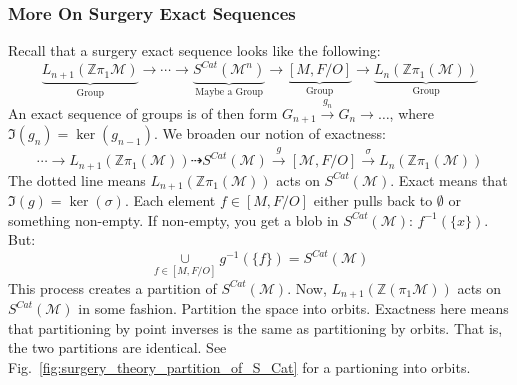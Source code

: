 \documentclass{article}
\theoremstyle{mystyle}
\begin{document}
\subsubsection{More On Surgery Exact Sequences}
Recall that a surgery exact sequence looks like the following:
\begin{equation*}
    \underset{\textrm{Group}}{\underbrace{L_{n+1}(\mathbb{Z}\pi_{1}\mathcal{M})}} \rightarrow \cdots \rightarrow \underset{\textrm{Maybe a Group}}{\underbrace{S^{Cat}(\mathcal{M}^{n})}} \rightarrow \underset{\textrm{Group}}{\underbrace{[M,F/O]}} \rightarrow \underset{\textrm{Group}}{\underbrace{L_{n}(\mathbb{Z}\pi_{1}(\mathcal{M}))}} 
\end{equation*}
An exact sequence of groups is of then form $G_{n+1}\overset{g_{n}}{\rightarrow} G_{n}\rightarrow \hdots$, where $\Im(g_n) = \ker(g_{n-1})$. We broaden our notion of exactness:
\begin{equation*}
    \cdots \rightarrow L_{n+1}(\mathbb{Z}\pi_{1}(\mathcal{M})) \dashrightarrow S^{Cat}(\mathcal{M}) \overset{g}{\rightarrow} [\mathcal{M},F/O] \overset{\sigma}{\rightarrow} L_{n}(\mathbb{Z}\pi_{1}(\mathcal{M}))
\end{equation*}
The dotted line means $L_{n+1}(\mathbb{Z}\pi_{1}(\mathcal{M}))$ acts on $S^{Cat}(\mathcal{M})$. Exact means that $\Im(g) = \ker(\sigma)$. Each element $f\in [M,F/O]$ either pulls back to $\emptyset$ or something non-empty. If non-empty, you get a blob in $S^{Cat}(\mathcal{M})$: $f^{-1}(\{x\})$. But:
\begin{equation*}
    \underset{f\in [M,F/O]}{\cup}g^{-1}(\{f\}) = S^{Cat}(\mathcal{M})
\end{equation*}
This process creates a partition of $S^{Cat}(\mathcal{M})$. Now, $L_{n+1}(\mathbb{Z}(\pi_{1}\mathcal{M}))$ acts on $S^{Cat}(\mathcal{M})$ in some fashion. Partition the space into orbits. Exactness here means that partitioning by point inverses is the same as partitioning by orbits. That is, the two partitions are identical. See Fig.~\ref{fig:surgery_theory_partition_of_S_Cat} for a partioning into orbits.
\end{document}
